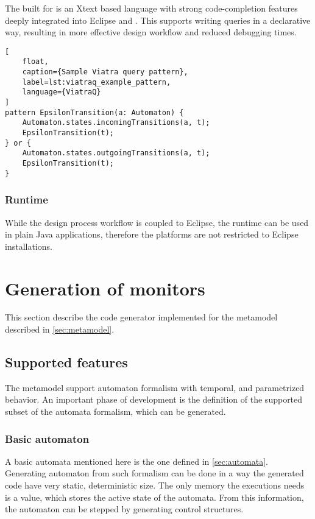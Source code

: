 The \dsl{} built for \viatraq{} is an Xtext based language with strong code-completion features deeply integrated into Eclipse and \emf{}. This \dsl{} supports writing queries in a declarative way, resulting in more effective design workflow and reduced debugging times.

\begin{lstlisting}[
	float,
	caption={Sample Viatra query pattern},
	label=lst:viatraq_example_pattern,
	language={ViatraQ}
]
pattern EpsilonTransition(a: Automaton) {
	Automaton.states.incomingTransitions(a, t);
	EpsilonTransition(t);
} or {
	Automaton.states.outgoingTransitions(a, t);
	EpsilonTransition(t);
}
\end{lstlisting}

\subsubsection{Runtime}

While the design process workflow is coupled to Eclipse, the \viatraq{} runtime can be used in plain Java applications, therefore the platforms are not restricted to Eclipse installations.

\section{Generation of monitors}

This section describe the code generator implemented for the metamodel described in \cref{sec:metamodel}.

\subsection{Supported features}

The metamodel support automaton formalism with temporal, and parametrized behavior. An important phase of development is the definition of the supported subset of the automata formalism, which can be generated.

\subsubsection{Basic automaton}

A basic automata mentioned here is the one defined in \cref{sec:automata}. Generating automaton from such formalism can be done in a way the generated code have very static, deterministic size. The only memory the executions needs is a value, which stores the active state of the automata. From this information, the automaton can be stepped by generating control structures.

